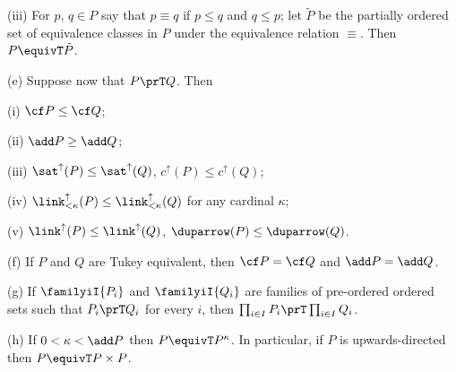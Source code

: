 \quad(iii) For $p$, $q\in P$ say that $p\equiv q$ if $p\le q$ and
$q\le p$;  let $\tilde P$ be the partially ordered set of equivalence
classes in $P$ under the equivalence relation $\equiv$.   Then $P\equivT\tilde P$.

(e) Suppose now that $P\prT Q$.   Then

\quad (i) $\cf P\le\cf Q$;

\quad (ii) $\add P\ge\add Q$;

\quad (iii) $\sat^{\uparrow}(P)\le\sat^{\uparrow}(Q)$,
$c^{\uparrow}(P)\le c^{\uparrow}(Q)$;

\quad (iv)
$\link_{<\kappa}^{\uparrow}(P)\le\link_{<\kappa}^{\uparrow}(Q)$ for any
cardinal $\kappa$;

\quad (v) $\link^{\uparrow}(P)\le\link^{\uparrow}(Q)$,
$\duparrow(P)\le\duparrow(Q)$.

(f) If $P$ and $Q$ are Tukey equivalent, then $\cf P=\cf Q$ and
$\add P=\add Q$.

(g) If $\familyiI{P_i}$ and $\familyiI{Q_i}$ are families of pre-ordered
ordered sets such that $P_i\prT Q_i$ for every $i$, then
$\prod_{i\in I}P_i\prT\prod_{i\in I}Q_i$.

(h) If $0<\kappa<\add P$ then
$P\equivT P^{\kappa}$.   In particular, if $P$ is upwards-directed then
$P\equivT P\times P$.

